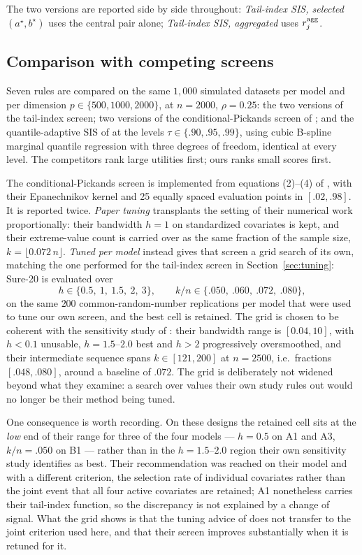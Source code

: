 The two versions are reported side by side throughout:
\emph{Tail-index SIS, selected $(a^\star,b^\star)$} uses the central
pair alone; \emph{Tail-index SIS, aggregated} uses $r_j^{\rm agg}$.

\subsection{Comparison with competing screens}\label{sec:comparison}

Seven rules are compared on the same $1{,}000$ simulated datasets per
model and per dimension $p\in\{500,1000,2000\}$, at $n=2000$,
$\rho=0.25$: the two versions of the tail-index screen; two versions of
the conditional-Pickands screen of \citet{yoshidaUmezu2026}; and the
quantile-adaptive SIS of \citet{heWangHong2013} at the levels
$\tau\in\{.90,.95,.99\}$, using cubic B-spline marginal quantile
regression with three degrees of freedom, identical at every level. The
competitors rank large utilities first; ours ranks small scores first.

The conditional-Pickands screen is implemented from equations (2)--(4)
of \citet{yoshidaUmezu2026}, with their Epanechnikov kernel and 25
equally spaced evaluation points in $[.02,.98]$. It is reported twice.
\emph{Paper tuning} transplants the setting of their numerical work
proportionally: their bandwidth $h=1$ on standardized covariates is
kept, and their extreme-value count is carried over as the same
fraction of the sample size, $k=\lfloor0.072\,n\rfloor$. \emph{Tuned per
model} instead gives that screen a grid search of its own, matching the
one performed for the tail-index screen in Section~\ref{sec:tuning}:
Sure-20 is evaluated over
\[
 h\in\{0.5,\ 1,\ 1.5,\ 2,\ 3\},
 \qquad
 k/n\in\{.050,\ .060,\ .072,\ .080\},
\]
on the same $200$ common-random-number replications per model that were
used to tune our own screen, and the best cell is retained. The grid is
chosen to be coherent with the sensitivity study of
\citet{yoshidaUmezu2026}: their bandwidth range is $[0.04,10]$, with
$h<0.1$ unusable, $h=1.5$--$2.0$ best and $h>2$ progressively
oversmoothed, and their intermediate sequence spans $k\in[121,200]$ at
$n=2500$, i.e.\ fractions $[.048,.080]$, around a baseline of $.072$. The
grid is deliberately not widened beyond what they examine: a search over
values their own study rules out would no longer be their method being
tuned.

One consequence is worth recording. On these designs the retained cell
sits at the \emph{low} end of their range for three of the four models
--- $h=0.5$ on A1 and A3, $k/n=.050$ on B1 --- rather than in the
$h=1.5$--$2.0$ region their own sensitivity study identifies as best.
Their recommendation was reached on their model and with a different
criterion, the selection rate of individual covariates rather than the
joint event that all four active covariates are retained; A1 nonetheless
carries their tail-index function, so the discrepancy is not explained by
a change of signal. What the grid shows is that the tuning advice of
\citet{yoshidaUmezu2026} does not transfer to the joint criterion used
here, and that their screen improves substantially when it is retuned
for it.

